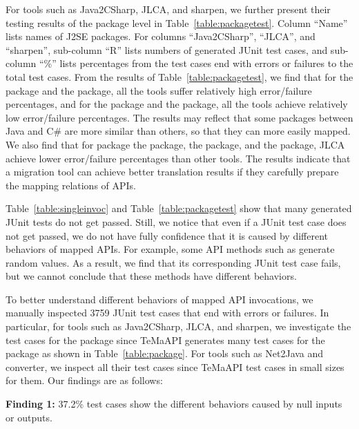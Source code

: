 For tools such as Java2CSharp, JLCA, and sharpen, we further present their testing results of the package level in Table~\ref{table:packagetest}. Column ``Name'' lists names of J2SE packages. For columns ``Java2CSharp'', ``JLCA'', and ``sharpen'', sub-column ``R'' lists numbers of generated JUnit test cases, and sub-column ``\%'' lists percentages from the test cases end with errors or failures to the total test cases. From the results of Table~\ref{table:packagetest}, we find that for the  package and the  package, all the tools suffer relatively high error/failure percentages, and for the  package and the  package, all the tools achieve relatively low error/failure percentages. The results may reflect that some packages between Java and C\# are more similar than others, so that they can more easily mapped. We also find that for package the  package, the  package, and the  package, JLCA achieve lower error/failure percentages than other tools. The results indicate that a migration tool can achieve better translation results if they carefully prepare the mapping relations of APIs.


Table~\ref{table:singleinvoc} and Table~\ref{table:packagetest} show that many generated JUnit tests do not get passed. Still, we notice that even if a JUnit test case does not get passed, we do not have fully confidence that it is caused by different behaviors of mapped APIs. For example, some API methods such as  generate random values. As a result, we find that its corresponding JUnit test case fails, but we cannot conclude that these methods have different behaviors.

To better understand different behaviors of mapped API invocations, we manually inspected 3759 JUnit test cases that end with errors or failures. In particular, for tools such as Java2CSharp, JLCA, and sharpen, we investigate the test cases for the  package since TeMaAPI generates many test cases for the package as shown in Table~\ref{table:package}. For tools such as Net2Java and converter, we inspect all their test cases since TeMaAPI test cases in small sizes for them. Our findings are as follows:

\textbf{Finding 1:} 37.2\% test cases show the different behaviors caused by null inputs or outputs.

